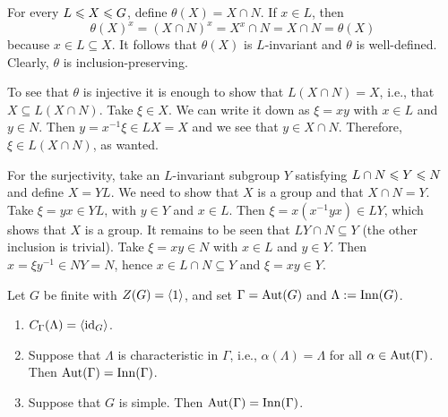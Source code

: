 \begin{solution} For every $L\leqslant X\leqslant G$, define $\theta(X)=X\cap N$. If $x\in L$, then
$$
    \theta(X)^x= (X\cap N)^x = X^x\cap N = X\cap N=\theta(X)
$$
because $x\in L\subseteq X$. It follows that $\theta(X)$ is $L$-invariant and $\theta$ is well-defined. Clearly, $\theta$ is inclusion-preserving.

To see that $\theta$ is injective it is enough to show that $L(X\cap N)=X$, i.e., that $X\subseteq L(X\cap N)$. Take $\xi\in X$. We can write it down as $\xi=xy$ with $x\in L$ and $y\in N$. Then $y=x^{-1}\xi\in LX=X$ and we see that $y\in X\cap N$. Therefore, $\xi\in L(X\cap N)$, as wanted.

For the surjectivity, take an $L$-invariant subgroup $Y$ satisfying $L\cap N\leqslant Y\leqslant N$ and define $X=YL$. We need to show that $X$ is a group and that $X\cap N=Y$. Take $\xi=yx\in YL$, with $y\in Y$ and $x\in L$. Then $\xi=x(x^{-1}yx)\in LY$, which shows that $X$ is a group. It remains to be seen that $LY\cap N\subseteq Y$ (the other inclusion is trivial). Take $\xi=xy\in N$ with $x\in L$ and $y\in Y$. Then $x=\xi y^{-1}\in NY=N$, hence $x\in L\cap N\subseteq Y$ and $\xi=xy\in Y$.  \end{solution}

\begin{exr}
    Let\/ $G$ be finite with\/ $Z(G) = \langle1\rangle$, and set\/ $\Gamma = {\rm Aut}(G)$ and\/ $\Lambda := \text{\rm Inn}(G)$.
    \begin{enumerate}[\rm a)]
        \item $C_\Gamma(\Lambda) = \langle\operatorname{id}_G\rangle$.
        \item Suppose that\/ $\Lambda$ is characteristic in\/ $\Gamma$, i.e., $\alpha(\Lambda)=\Lambda$ for all\/ $\alpha \in {\rm Aut}(\Gamma)$. Then\/ ${\rm Aut}(\Gamma) = {\rm Inn}(\Gamma)$.
        \item Suppose that\/ $G$ is simple. Then\/ ${\rm Aut}(\Gamma) = {\rm Inn}(\Gamma)$.
    \end{enumerate}
\end{exr}

